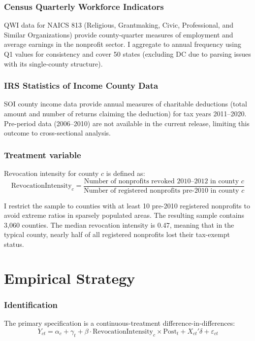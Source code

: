 \documentclass[12pt]{article}
\begin{document}
\subsubsection*{Census Quarterly Workforce Indicators}
QWI data for NAICS 813 (Religious, Grantmaking, Civic, Professional, and Similar Organizations) provide county-quarter measures of employment and average earnings in the nonprofit sector. I aggregate to annual frequency using Q1 values for consistency and cover 50 states (excluding DC due to parsing issues with its single-county structure).

\subsubsection*{IRS Statistics of Income County Data}
SOI county income data provide annual measures of charitable deductions (total amount and number of returns claiming the deduction) for tax years 2011--2020. Pre-period data (2006--2010) are not available in the current release, limiting this outcome to cross-sectional analysis.

\subsubsection*{Treatment variable}
Revocation intensity for county $c$ is defined as:
\begin{equation}
\text{RevocationIntensity}_c = \frac{\text{Number of nonprofits revoked 2010--2012 in county } c}{\text{Number of registered nonprofits pre-2010 in county } c}
\end{equation}

\noindent I restrict the sample to counties with at least 10 pre-2010 registered nonprofits to avoid extreme ratios in sparsely populated areas. The resulting sample contains 3,060 counties. The median revocation intensity is 0.47, meaning that in the typical county, nearly half of all registered nonprofits lost their tax-exempt status.



\section{Empirical Strategy}

\subsubsection*{Identification}
The primary specification is a continuous-treatment difference-in-differences:
\begin{equation}
Y_{ct} = \alpha_c + \gamma_t + \beta \cdot \text{RevocationIntensity}_c \times \text{Post}_t + X_{ct}'\delta + \varepsilon_{ct}
\end{equation}
\end{document}
